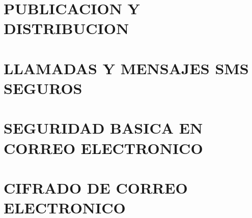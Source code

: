 \documentclass[oribibl,oneside]{scrbook}
\begin{document}
\chapter{PUBLICACION Y DISTRIBUCION}
\clearpage

\clearpage

\clearpage

\graphicspath{{./capitulo_05_LLAMADAS_Y_MENSAJES_SMS_SEGUROS/}}
\chapter{LLAMADAS Y MENSAJES SMS SEGUROS}
\clearpage

\clearpage

\graphicspath{{./capitulo_06_SEGURIDAD_BASICA_EN_CORREO_ELECTRONICO/}}
\chapter{SEGURIDAD BASICA EN CORREO ELECTRONICO}
\clearpage

\clearpage

\clearpage

\graphicspath{{./capitulo_07_CIFRADO_DE_CORREO_ELECTRONICO/}}
\chapter{CIFRADO DE CORREO ELECTRONICO}
\clearpage

\clearpage

\clearpage

\clearpage

\clearpage

\clearpage

\clearpage

\clearpage

\graphicspath{{./capitulo_08_NAVEGACION_SEGURA/}}
\end{document}
